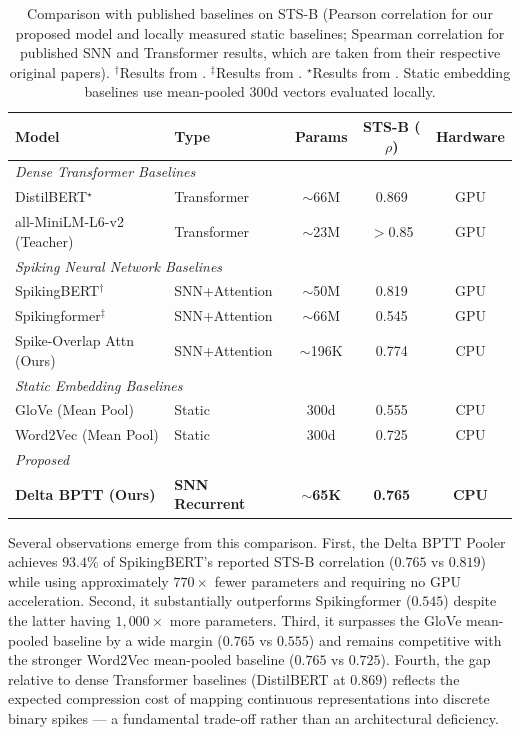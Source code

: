 \documentclass[runningheads]{llncs}
\begin{document}
\begin{table}[t]
\caption{Comparison with published baselines on STS-B (Pearson correlation for our proposed model and locally measured static baselines; Spearman correlation for published SNN and Transformer results, which are taken from their respective original papers). $^\dagger$Results from \cite{bal2024spikingbert}. $^\ddagger$Results from \cite{zhou2025spikingformer}. $^\star$Results from \cite{sanh2019distilbert}. Static embedding baselines use mean-pooled 300d vectors evaluated locally.}\label{tab:external_baselines}
\centering
\begin{tabular}{llccc}
\toprule
\textbf{Model} & \textbf{Type} & \textbf{Params} & \textbf{STS-B ($\rho$)} & \textbf{Hardware} \\
\midrule
\multicolumn{5}{l}{\textit{Dense Transformer Baselines}} \\
DistilBERT$^\star$ & Transformer & $\sim$66M & 0.869 & GPU \\
all-MiniLM-L6-v2 (Teacher) & Transformer & $\sim$23M & $>$0.85 & GPU \\
\midrule
\multicolumn{5}{l}{\textit{Spiking Neural Network Baselines}} \\
SpikingBERT$^\dagger$ & SNN+Attention & $\sim$50M & 0.819 & GPU \\
Spikingformer$^\ddagger$ & SNN+Attention & $\sim$66M & 0.545 & GPU \\
Spike-Overlap Attn (Ours) & SNN+Attention & $\sim$196K & 0.774 & CPU \\
\midrule
\multicolumn{5}{l}{\textit{Static Embedding Baselines}} \\
GloVe (Mean Pool) & Static & 300d & 0.555 & CPU \\
Word2Vec (Mean Pool) & Static & 300d & 0.725 & CPU \\
\midrule
\multicolumn{5}{l}{\textit{Proposed}} \\
\textbf{Delta BPTT (Ours)} & \textbf{SNN Recurrent} & \textbf{$\sim$65K} & \textbf{0.765} & \textbf{CPU} \\
\bottomrule
\end{tabular}
\end{table}

Several observations emerge from this comparison. First, the Delta BPTT Pooler achieves $93.4\%$ of SpikingBERT's reported STS-B correlation ($0.765$ vs $0.819$) while using approximately $770\times$ fewer parameters and requiring no GPU acceleration. Second, it substantially outperforms Spikingformer ($0.545$) despite the latter having $1{,}000\times$ more parameters. Third, it surpasses the GloVe mean-pooled baseline by a wide margin ($0.765$ vs $0.555$) and remains competitive with the stronger Word2Vec mean-pooled baseline ($0.765$ vs $0.725$). Fourth, the gap relative to dense Transformer baselines (DistilBERT at $0.869$) reflects the expected compression cost of mapping continuous representations into discrete binary spikes --- a fundamental trade-off rather than an architectural deficiency.
\end{document}
